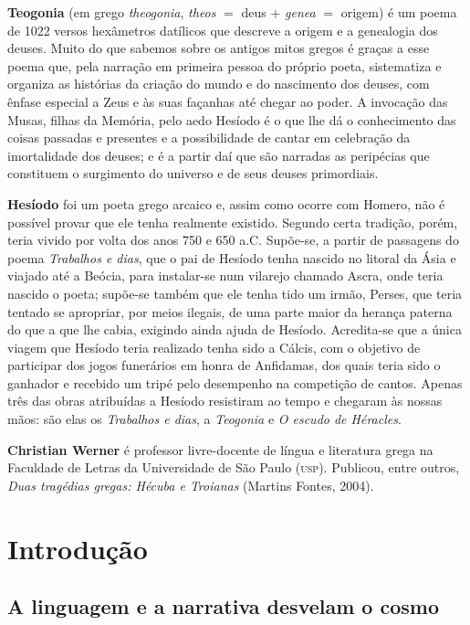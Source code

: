 \textbf{Teogonia} (em grego \textit{theogonia}, \textit{theos} $=$ deus +
\textit{genea} $=$ origem) é um poema de 1022 versos hexâmetros datílicos que
descreve a origem e a genealogia dos deuses. Muito do que sabemos sobre os
antigos mitos gregos é graças a esse poema que, pela narração em primeira
pessoa do próprio poeta, sistematiza e organiza as histórias da criação do
mundo e do nascimento dos deuses, com ênfase especial a Zeus e às suas façanhas até chegar ao poder. A invocação das Musas, filhas da Memória, pelo aedo Hesíodo é o que lhe dá o conhecimento das coisas passadas e presentes e a possibilidade de cantar em celebração da imortalidade dos deuses; e é a partir daí que são narradas as peripécias que constituem o surgimento do universo e de seus deuses primordiais.  

\textbf{Hesíodo} foi um poeta grego arcaico e, assim como ocorre com Homero, não é possível provar que ele tenha realmente existido. Segundo certa tradição, porém, teria vivido por volta dos anos 750 e 650 a.C.  Supõe-se, a partir de passagens do poema \textit{Trabalhos e dias}, que o pai de Hesíodo tenha nascido no litoral da Ásia e viajado até a Beócia, para instalar-se num vilarejo chamado Ascra, onde teria nascido o poeta; supõe-se também que ele tenha tido um irmão, Perses, que teria tentado se apropriar, por meios ilegais, de uma parte maior da herança paterna do que a que lhe cabia, exigindo ainda ajuda de Hesíodo. Acredita-se que a única viagem que Hesíodo teria realizado tenha sido a Cálcis, com o objetivo de participar dos jogos funerários em honra de Anfidamas, dos quais teria sido o ganhador e recebido um tripé pelo desempenho na competição de cantos. Apenas três das obras atribuídas a Hesíodo resistiram ao tempo e chegaram às nossas mãos: são elas os \textit{Trabalhos e dias}, a \textit{Teogonia} e \textit{O escudo de Héracles}.

\textbf{Christian Werner} é professor livre-docente de língua e literatura grega na Faculdade de Letras da Universidade de São Paulo (\textsc{usp}). Publicou, entre outros, \textit{Duas tragédias gregas: Hécuba e Troianas} (Martins Fontes, 2004).

\chapter{Introdução}
\section{A linguagem e a narrativa desvelam o cosmo}


